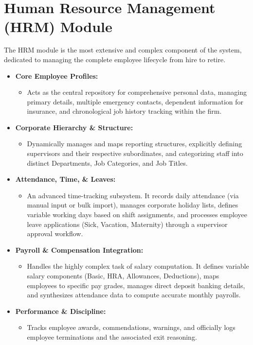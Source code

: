 ﻿\documentclass[12pt,a4paper]{report}
\begin{document}
\section*{Human Resource Management (HRM) Module}
The HRM module is the most extensive and complex component of the system, dedicated to managing the complete employee lifecycle from hire to retire.
\begin{itemize}
    \item \textbf{Core Employee Profiles:}
    \begin{itemize}
        \item Acts as the central repository for comprehensive personal data, managing primary details, multiple emergency contacts, dependent information for insurance, and chronological job history tracking within the firm.
    \end{itemize}
    \item \textbf{Corporate Hierarchy \& Structure:}
    \begin{itemize}
        \item Dynamically manages and maps reporting structures, explicitly defining supervisors and their respective subordinates, and categorizing staff into distinct Departments, Job Categories, and Job Titles.
    \end{itemize}
    \item \textbf{Attendance, Time, \& Leaves:}
    \begin{itemize}
        \item An advanced time-tracking subsystem. It records daily attendance (via manual input or bulk import), manages corporate holiday lists, defines variable working days based on shift assignments, and processes employee leave applications (Sick, Vacation, Maternity) through a supervisor approval workflow.
    \end{itemize}
    \item \textbf{Payroll \& Compensation Integration:}
    \begin{itemize}
        \item Handles the highly complex task of salary computation. It defines variable salary components (Basic, HRA, Allowances, Deductions), maps employees to specific pay grades, manages direct deposit banking details, and synthesizes attendance data to compute accurate monthly payrolls.
    \end{itemize}
    \item \textbf{Performance \& Discipline:}
    \begin{itemize}
        \item Tracks employee awards, commendations, warnings, and officially logs employee terminations and the associated exit reasoning.
    \end{itemize}
\end{itemize}
\end{document}
